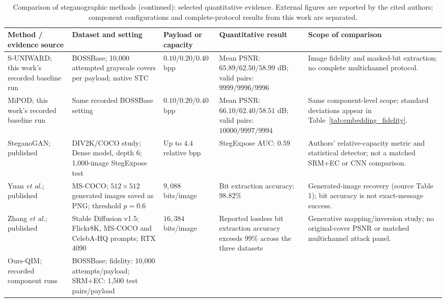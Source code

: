 \documentclass[pdflatex,sn-mathphys-num]{sn-jnl}%
\renewcommand{\arraystretch}{1.2}
\renewcommand{\arraystretch}{1.0}
\theoremstyle{definition}
\theoremstyle{game}
\theoremstyle{thmstyleone}%
\theoremstyle{thmstyletwo}%
\theoremstyle{thmstylethree}%
\begin{document}
\begin{table}
\ContinuedFloat
\centering
\caption{Comparison of steganographic methods (continued): selected quantitative evidence.
External figures are reported by the cited authors; component configurations and complete-protocol results from this work are separated.}
\label{tab:rw-quantitative}
\small
\setlength{\tabcolsep}{5pt}
\renewcommand{\arraystretch}{1.13}
\begin{tabularx}{0.98\textheight}{@{}L{0.78}L{1.08}L{0.86}L{1.23}L{1.05}@{}}
\toprule
\textbf{Method / evidence source} & \textbf{Dataset and setting} &
\textbf{Payload or capacity} & \textbf{Quantitative result} & \textbf{Scope of comparison}\\
\midrule
S-UNIWARD; this work's recorded baseline run &
BOSSBase; 10,000 attempted grayscale covers per payload; native STC &
$0.10/0.20/0.40$ bpp &
Mean PSNR: $65.89/62.50/58.99$ dB; valid pairs: $9999/9996/9996$ &
Image fidelity and masked-bit extraction; no complete multichannel protocol.\\
\addlinespace[3pt]
MiPOD; this work's recorded baseline run &
Same recorded BOSSBase setting &
$0.10/0.20/0.40$ bpp &
Mean PSNR: $66.10/62.40/58.51$ dB; valid pairs: $10000/9997/9994$ &
Same component-level scope; standard deviations appear in Table~\ref{tab:embedding_fidelity}.\\
\addlinespace[3pt]
SteganoGAN; published \cite{zhang2019steganogan} &
DIV2K/COCO study; Dense model, depth 6; 1,000-image StegExpose test &
Up to $4.4$ relative bpp &
StegExpose AUC: $0.59$ &
Authors' relative-capacity metric and statistical detector; not a matched SRM+EC or CNN comparison.\\
\addlinespace[3pt]
Yuan \emph{et al.}; published \cite{yuan2026provably} &
MS-COCO; $512\times512$ generated images saved as PNG; threshold $p=0.6$ &
$9{,}088$ bits/image &
Bit extraction accuracy: $98.82\%$ &
Generated-image recovery (source Table 1); bit accuracy is not exact-message success.\\
\addlinespace[3pt]
Zhang \emph{et al.}; published \cite{Zhang2026MappingDiffusion} &
Stable Diffusion v1.5; Flickr8K, MS-COCO and CelebA-HQ prompts; RTX 4090 &
$16{,}384$ bits/image &
Reported lossless bit extraction accuracy exceeds $99\%$ across the three datasets &
Generative mapping/inversion study; no original-cover PSNR or matched multichannel attack panel.\\
\addlinespace[3pt]
Ours-QIM; recorded component runs &
BOSSBase; fidelity: 10,000 attempts/payload; SRM+EC: 1,500 test pairs/payload &

\end{tabularx}
\end{table}
\end{document}
